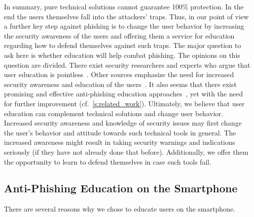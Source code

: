  In summary, pure technical solutions cannot guarantee 100\% protection.
 In the end the users themselves fall into the attackers' traps.
 Thus, in our point of view a further key step against phishing is to change the user behavior by increasing the security awareness of the users and offering them a service for education regarding how to defend themselves against such traps.
The major question to ask here is whether education will help combat phishing.
The opinions on this question are divided.
There exist security researchers and experts who argue that user education is pointless~\cite{useredupointless, bruceschneieronsecuritytraining}.
Other sources emphasize the need for increased security awareness and education of the users~\cite{usereducebit, usereduscmagazine}.
It also seems that there exist promising and effective anti-phishing education approaches~\cite{kumaraguru2007protecting, sheng2007antiphishingphil}, yet with the need for further improvement (cf.~\autoref{s:related_work}).
Ultimately, we believe that user education can complement technical solutions and change user behavior.
Increased security awareness and knowledge of security issues may first change the user's behavior and attitude towards such technical tools in general.
The increased awareness might result in taking security warnings and indications seriously (if they have not already done that before).
Additionally, we offer them the opportunity to learn to defend themselves in case such tools fail.

\subsection{Anti-Phishing Education on the Smartphone}
\label{s:antiphishing_on_smartphone}
There are several reasons why we chose to educate users on the smartphone.

